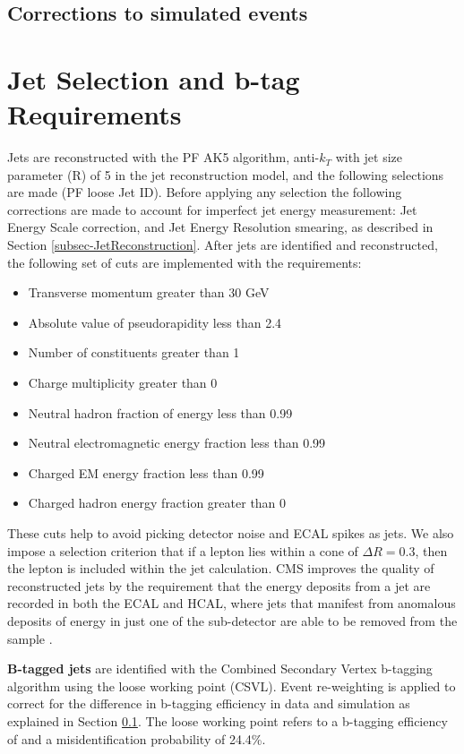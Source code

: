 \subsection{Corrections to simulated events} \label{subsec-SimulatedEventsCorrection}

\section{Jet Selection and b-tag Requirements} \label{sec-JetSelection}

Jets are reconstructed with the PF AK5 algorithm, anti-$k_T$ with jet size parameter (R) of 5 in the jet reconstruction model, and the following selections are made (PF loose Jet ID). Before applying any selection the following corrections are made to account for imperfect jet energy measurement: Jet Energy Scale correction, and Jet Energy Resolution smearing, as described in Section \ref{subsec-JetReconstruction}. After jets are identified and reconstructed, the following set of cuts are implemented with the requirements:

\begin{itemize}
	\item Transverse momentum greater than 30 GeV
	\item Absolute value of pseudorapidity less than 2.4
	\item Number of constituents greater than 1
	\item Charge multiplicity greater than 0
	\item Neutral hadron fraction of energy less than 0.99
	\item Neutral electromagnetic energy fraction less than 0.99
	\item Charged EM energy fraction less than 0.99
	\item Charged hadron energy fraction greater than 0
\end{itemize}

These cuts help to avoid picking detector noise and ECAL spikes as jets. We also impose a selection criterion that if a lepton lies within a cone of $\Delta R = 0.3$, then the lepton is included within the jet calculation. CMS improves the quality of reconstructed jets by the requirement that the energy deposits from a jet are recorded in both the ECAL and HCAL, where jets that manifest from anomalous deposits of energy in just one of the sub-detector are able to be removed from the sample \cite{CMS-PAS-JME-10-003}.

 \textbf{B-tagged jets} are identified with the Combined Secondary Vertex b-tagging algorithm using the loose working point (CSVL). Event re-weighting is applied to correct for the difference in b-tagging efficiency in data and simulation as explained in Section \ref{subsec-SimulatedEventsCorrection}. The loose working point refers to a b-tagging efficiency of  and a misidentification probability of 24.4\%.

